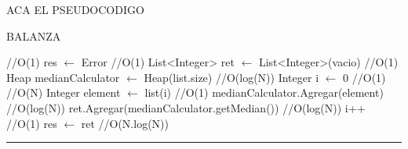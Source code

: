 
ACA EL PSEUDOCODIGO

\begin{algorithm}[H]
\caption{BALANZA}
\begin{algorithmic}[1]
 \hfill //O(1)
\state res $\gets$ Error \hfill //O(1)
\endif
\state List<Integer> ret $\gets$ List<Integer>(vacio) \hfill //O(1)
\state Heap medianCalculator $\gets$ Heap(list.size) \hfill //O(log(N))
\state Integer i $\gets$ 0 \hfill //O(1)
 \hfill //O(N) %
\state Integer element  $\gets$ list(i) \hfill //O(1)
\state medianCalculator.Agregar(element) \hfill //O(log(N))
\state ret.Agregar(medianCalculator.getMedian()) \hfill //O(log(N))
\state i++ \hfill //O(1)
\endwhile
\state res $\gets$  ret \hfill //O(N.log(N))
\EndFunction 
\end{algorithmic}
\hrule
{}
\end{algorithm}

